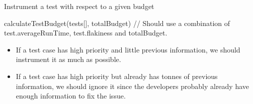 \begin{algorithm}
\caption{}
\label{alg2}
\begin{algorithmic}
	\ENDFOR

	\ENDFOR
\end{algorithmic}
\end{algorithm}

\begin{algorithm}
\caption{Instrument a test with respect to a given budget}
\label{alg4}
\begin{algorithmic}
		\ELSE
		\ENDIF
	\ENDFOR
\end{algorithmic}
\end{algorithm}

calculateTestBudget(tests[], totalBudget) {
	// Should use a combination of test.averageRunTime, test.flakiness and totalBudget.
}

\begin{itemize}
	\item If a test case has high priority and little previous information, we should instrument it as much as possible.
	\item If a test case has high priority but already has tonnes of previous information, we should ignore it since the developers probably already have enough information to fix the issue.
\end{itemize}


